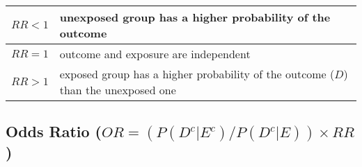 \begin{customArrayStretch}{1.2}
    \begin{table}[H]
        \centering
        \begin{tabular}{|c|p{14cm}|}
            \hline
    
            $RR < 1$ & unexposed group has a higher probability of the outcome
            \cite{statistics/book/Statistics-for-Data-Scientists/Maurits-Kaptein} \\
            \hline
            
            $RR = 1$ & outcome and exposure are independent 
            \cite{statistics/book/Statistics-for-Data-Scientists/Maurits-Kaptein} \\
            \hline
            
            $RR > 1$ & exposed group has a higher probability of the outcome ($D$) than the unexposed one 
            \cite{statistics/book/Statistics-for-Data-Scientists/Maurits-Kaptein} \\
            \hline
        \end{tabular}
    \end{table}
\end{customArrayStretch}



\subsection{Odds Ratio ($OR = ({P (D^c|E^c)}/{P (D^c|E)}) \times RR$)}

